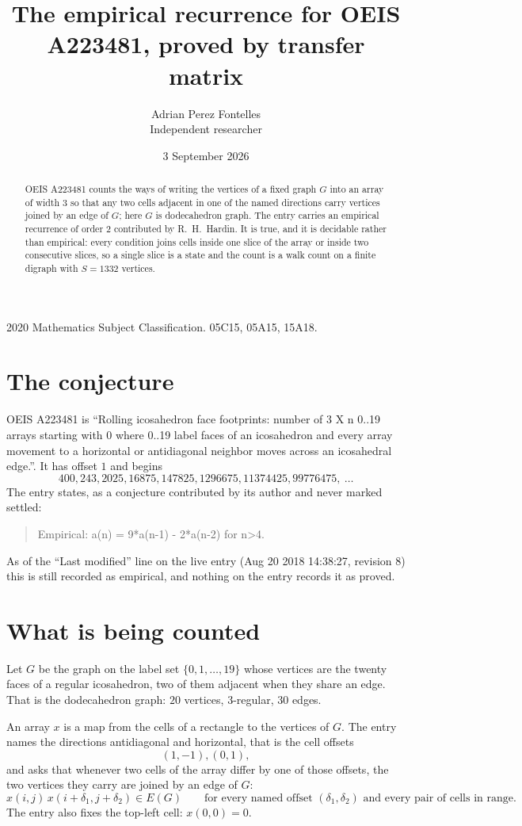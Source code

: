 \documentclass[11pt,a4paper]{article}
\title{The empirical recurrence for OEIS A223481, proved by transfer matrix}
\author{Adrian Perez Fontelles\\ \small Independent researcher}
\date{3 September 2026}
\theoremstyle{plain}
\theoremstyle{definition}
\begin{document}
\maketitle

\begin{abstract}
OEIS A223481 counts the ways of writing the vertices of a fixed graph $G$ into an array of width
$3$ so that any two cells adjacent in one of the named directions carry vertices joined by an
edge of $G$; here $G$ is dodecahedron graph. The entry carries an empirical recurrence of order $2$
contributed by R.~H.~Hardin. It is true, and it is decidable rather than empirical: every
condition joins cells inside one slice of the array or inside two consecutive slices, so a
single slice is a state and the count is a walk count on a finite digraph with $S=1332$ vertices.
\end{abstract}

\noindent\small 2020 Mathematics Subject Classification. 05C15, 05A15, 15A18.\normalsize

\section{The conjecture}

OEIS A223481 is ``Rolling icosahedron face footprints: number of 3 X n 0..19 arrays starting with 0 where 0..19 label faces of an icosahedron and every array movement to a horizontal or antidiagonal neighbor moves across an icosahedral edge.''. It has offset $1$ and begins
\[
400, 243, 2025, 16875, 147825, 1296675, 11374425, 99776475,\ \dots
\]
The entry states, as a conjecture contributed by its author and never marked settled:
\begin{quote}
Empirical: a(n) = 9*a(n-1) - 2*a(n-2) for n>4.
\end{quote}
As of the ``Last modified'' line on the live entry (Aug 20 2018 14:38:27, revision 8) this is still
recorded as empirical, and nothing on the entry records it as proved.

\section{What is being counted}

Let $G$ be the graph on the label set $\{0,1,\dots,19\}$ whose vertices are the twenty faces of a regular icosahedron, two of them adjacent when they share an edge. That is the dodecahedron graph: $20$ vertices, $3$-regular, $30$ edges.

An array $x$ is a map from the cells of a rectangle to the vertices of $G$. The entry names the
directions antidiagonal and horizontal, that is the cell offsets
\[
(1,-1), (0,1),
\]
and asks that whenever two cells of the array differ by one of those offsets, the two vertices
they carry are joined by an edge of $G$:
\[
x(i,j)\,x(i+\delta_1,j+\delta_2)\in E(G)\qquad
\text{for every named offset } (\delta_1,\delta_2)\text{ and every pair of cells in range.}
\]
The entry also fixes the top-left cell: $x(0,0)=0$.
\end{document}
